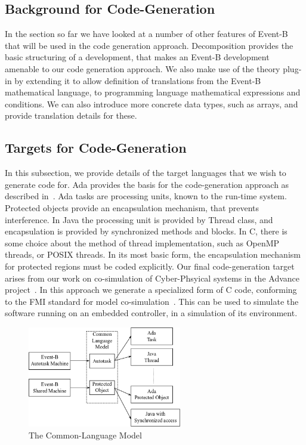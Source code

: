 \subsection{Background for Code-Generation}
In the section so far we have looked at a number of other features of Event-B that will be used in the code generation approach. Decomposition provides the basic structuring of a development, that makes an Event-B development amenable to our code generation approach. We also make use of the theory plug-in by extending it to allow definition of translations from the Event-B mathematical language, to programming language mathematical expressions and conditions. We can also introduce more concrete data types, such as arrays, and provide translation details for these. 

\subsection{Targets for Code-Generation}\label{targets}
In this subsection, we provide details of the target languages that we wish to generate code for. Ada provides the basis for the code-generation approach as described in~\cite{Edmunds2012a}. Ada tasks are processing units, known to the run-time system. Protected objects provide an encapsulation mechanism, that prevents interference. In Java the processing unit is provided by Thread class, and encapsulation is provided by synchronized methods and blocks. In C, there is some choice about the method of thread implementation, such as OpenMP~\cite{openmp} threads, or POSIX threads\cite{pthreads}. In its most basic form, the encapsulation mechanism for protected regions must be coded explicitly. Our final code-generation target arises from our work on co-simulation of Cyber-Phsyical systems in the Advance project~\cite{advance}. In this approach we generate a specialized form of C code, conforming to the FMI standard for model co-simulation~\cite{FMISTD}. This can be used to simulate the software running on an embedded controller, in a simulation of its environment.   
%
\begin{figure}
\centering
\includegraphics[width=0.6\textwidth]{graphics/B_IL1_others.png}
\caption{The Common-Language Model}
\label{fig:B_IL1_others}
\end{figure}
